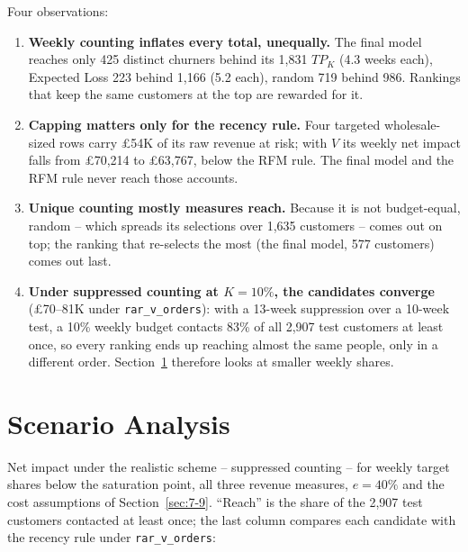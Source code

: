 Four observations:
\begin{enumerate}
    \item \textbf{Weekly counting inflates every total, unequally.} The final model reaches only 425 distinct churners behind its 1,831 $TP_K$ (4.3 weeks each), Expected Loss 223 behind 1,166 (5.2 each), random 719 behind 986. Rankings that keep the same customers at the top are rewarded for it.
    \item \textbf{Capping matters only for the recency rule.} Four targeted wholesale-sized rows carry \pounds54K of its raw revenue at risk; with $V$ its weekly net impact falls from \pounds70,214 to \pounds63,767, below the RFM rule. The final model and the RFM rule never reach those accounts.
    \item \textbf{Unique counting mostly measures reach.} Because it is not budget-equal, random -- which spreads its selections over 1,635 customers -- comes out on top; the ranking that re-selects the most (the final model, 577 customers) comes out last.
    \item \textbf{Under suppressed counting at $K=10\%$, the candidates converge} (\pounds70--81K under \texttt{rar\_v\_orders}): with a 13-week suppression over a 10-week test, a 10\% weekly budget contacts 83\% of all 2,907 test customers at least once, so every ranking ends up reaching almost the same people, only in a different order. Section~\ref{sec:7-10} therefore looks at smaller weekly shares.
\end{enumerate}

\section{Scenario Analysis}
\label{sec:7-10}

Net impact under the realistic scheme -- suppressed counting -- for weekly target shares below the saturation point, all three revenue measures, $e=40\%$ and the cost assumptions of Section~\ref{sec:7-9}. ``Reach'' is the share of the 2,907 test customers contacted at least once; the last column compares each candidate with the recency rule under \texttt{rar\_v\_orders}:

